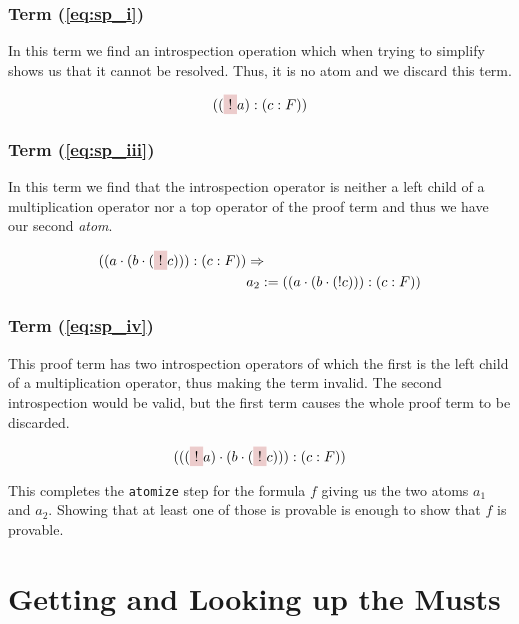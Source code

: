 \subsubsection[Second term]{Term (\ref{eq:sp_i})}
In this term we find an introspection operation which when trying to simplify shows us that it cannot be resolved. Thus, it is no atom and we discard this term.

\begin{equation*}
	((\tikz[baseline]{\node[fill=red!20,anchor=base] (t1){$!$};}a):(c:F)) 
\end{equation*}


\subsubsection[Third term]{Term (\ref{eq:sp_iii})}
In this term we find that the introspection operator is neither a left child of a multiplication operator nor a top operator of the proof term and thus we have our second \emph{atom}.

\begin{equation}\label{eq:a_2}
	\begin{split}
	((a \cdot(b\cdot (\tikz[baseline]{\node[fill=red!20,anchor=base] (t1){$!$};} c))):(c:F))	 & \Rightarrow \\
	& a_2 := ((a \cdot(b\cdot (! c))):(c:F))
	\end{split}
\end{equation}


\subsubsection[Fourth term]{Term (\ref{eq:sp_iv})}
This proof term has two introspection operators of which the first is the left child of a multiplication operator, thus making the term invalid. The second introspection would be valid, but the first term causes the whole proof term to be discarded.

\begin{equation*}
	(((
	\tikz[baseline]{\node[fill=red!20,anchor=base] (t1){$!$};} a)\cdot(b\cdot (
	\tikz[baseline]{\node[fill=red!20,anchor=base] (t1){$!$};} c))):(c:F))
\end{equation*}


\bigskip
This completes the \texttt{atomize} step for the formula $f$ giving us the two atoms $a_1$ and $a_2$. Showing that at least one of those is provable is enough to show that $f$ is provable. 

\section{Getting and Looking up the Musts}


